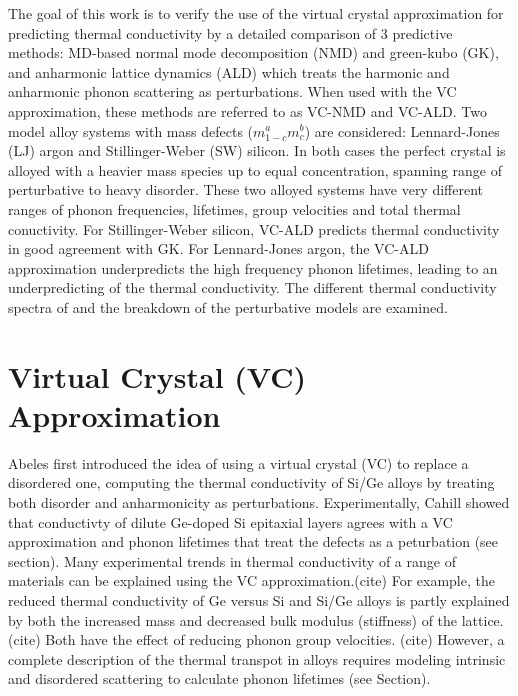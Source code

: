 \documentclass[aps,prb,twocolumn,superscriptaddress,preprintnumbers,amsmath,amssymb,floatfix]{revtex4}
\begin{document}
The goal of this work is to verify the use of the virtual crystal 
approximation for predicting thermal conductivity by a detailed comparison 
of 3 predictive methods: MD-based normal mode 
decomposition (NMD) and green-kubo (GK), 
and anharmonic lattice dynamics (ALD) which treats the harmonic and 
anharmonic phonon scattering as perturbations. When used with the VC 
approximation, these methods are referred to as VC-NMD and VC-ALD.
Two model alloy systems 
with mass defects ($m^a_{1-c}m^b_{c}$) are considered: 
Lennard-Jones (LJ) argon and Stillinger-Weber (SW) silicon. 
In both cases the perfect crystal is 
alloyed with a heavier mass species up to equal concentration, spanning 
range of perturbative to heavy disorder. These 
two alloyed systems have very different ranges of phonon frequencies, 
lifetimes, group velocities and total thermal conuctivity. 
For Stillinger-Weber silicon, 
VC-ALD predicts thermal conductivity in good agreement with GK. 
For Lennard-Jones argon, the VC-ALD approximation underpredicts 
the high frequency phonon lifetimes, leading to an underpredicting of 
the thermal conductivity. The different thermal conductivity spectra of 
and the breakdown of the perturbative models are examined.

\section{\label{S:}Virtual Crystal (VC) Approximation}

Abeles first introduced the idea of using a virtual crystal (VC) to 
replace a disordered one, computing the
thermal conductivity of Si/Ge alloys by treating both
disorder and anharmonicity as perturbations.\cite{abeles_lattice_1963} 
Experimentally, 
Cahill showed that conductivty of dilute Ge-doped Si epitaxial layers
agrees with 
a VC approximation and phonon lifetimes that 
treat the defects as a peturbation (see section).
\cite{cahill_thermal_2004} 
Many experimental trends in thermal conductivity 
of a range of materials 
can be explained using the VC approximation.(cite) For example,
the reduced thermal conductivity of Ge versus Si and Si/Ge alloys 
is partly explained 
by both the increased mass and decreased bulk modulus (stiffness) of the 
lattice.(cite) Both have the effect of reducing phonon group velocities.
(cite) However, a complete 
description of the thermal transpot in alloys requires modeling intrinsic 
and 
disordered scattering to calculate phonon lifetimes (see Section).
\end{document}
